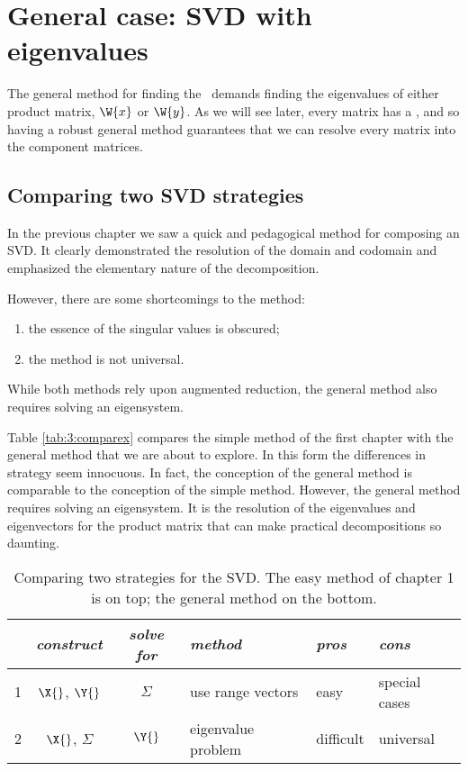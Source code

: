 \chapter[SVD with eigenvalues]{General case: SVD with eigenvalues}
\label{chap:general}
The general method for finding the \svdp \ demands finding the eigenvalues of either product matrix, $\W{x}$ or $\W{y}$. As we will see later, every matrix has a \svdl, and so having a robust general method guarantees that we can resolve every matrix into the component matrices.

\section{Comparing two SVD strategies}
In the previous chapter we saw a quick and pedagogical method for composing an SVD. It clearly demonstrated the resolution of the domain and codomain and emphasized the elementary nature of the decomposition.

However, there are some shortcomings to the method: 
\begin{enumerate}
\item the essence of the singular values is obscured;
\item the method is not universal.
\end{enumerate}

While both methods rely upon augmented reduction, the general method also requires solving an eigensystem.

Table \eqref{tab:3:comparex} compares the simple method of the first chapter with the general method that we are about to explore. In this form the differences in strategy seem innocuous. In fact, the conception of the general method is comparable to the conception of the simple method. However, the general method requires solving an eigensystem. It is the resolution of the eigenvalues and eigenvectors for the product matrix that can make practical decompositions so daunting. 

\begin{table}[h]
\begin{center}
\begin{tabular}{l|cclll }
 & {\it construct} & {\it solve for} & {\it method} & {\it pros} & {\it cons} \\ \hline
 1 & $\X{}$, $\Y{}$ & $\Sigma$ & use range vectors & easy & special cases \\[3pt]
 2 & $\X{}$, $\Sigma$ & $\Y{}$  & eigenvalue problem  & difficult & universal \\[3pt]\hline
\end{tabular}
\end{center}
\label{tab:3:comparex}
\caption[Comparing two strategies for the SVD]{Comparing two strategies for the SVD. The easy method of chapter 1 is on top; the general method on the bottom.}
\end{table}%







\endinput